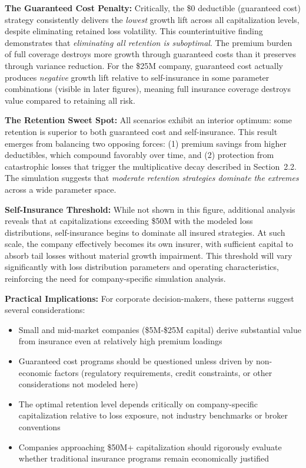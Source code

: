 \documentclass[11pt,letterpaper]{article}
\begin{document}
\vspace{\baselineskip}

\textbf{The Guaranteed Cost Penalty:} Critically, the \$0 deductible (guaranteed cost) strategy consistently delivers the \emph{lowest} growth lift across all capitalization levels, despite eliminating retained loss volatility. This counterintuitive finding demonstrates that \emph{eliminating all retention is suboptimal}. The premium burden of full coverage destroys more growth through guaranteed costs than it preserves through variance reduction. For the \$25M company, guaranteed cost actually produces \emph{negative} growth lift relative to self-insurance in some parameter combinations (visible in later figures), meaning full insurance coverage destroys value compared to retaining all risk.

\vspace{\baselineskip}

\textbf{The Retention Sweet Spot:} All scenarios exhibit an interior optimum: some retention is superior to both guaranteed cost and self-insurance. This result emerges from balancing two opposing forces: (1) premium savings from higher deductibles, which compound favorably over time, and (2) protection from catastrophic losses that trigger the multiplicative decay described in Section~2.2. The simulation suggests that \emph{moderate retention strategies dominate the extremes} across a wide parameter space.

\vspace{\baselineskip}

\textbf{Self-Insurance Threshold:} While not shown in this figure, additional analysis reveals that at capitalizations exceeding \$50M with the modeled loss distributions, self-insurance begins to dominate all insured strategies. At such scale, the company effectively becomes its own insurer, with sufficient capital to absorb tail losses without material growth impairment. This threshold will vary significantly with loss distribution parameters and operating characteristics, reinforcing the need for company-specific simulation analysis.

\vspace{\baselineskip}

\textbf{Practical Implications:} For corporate decision-makers, these patterns suggest several considerations:
\begin{itemize}
    \item Small and mid-market companies (\$5M-\$25M capital) derive substantial value from insurance even at relatively high premium loadings
    \item Guaranteed cost programs should be questioned unless driven by non-economic factors (regulatory requirements, credit constraints, or other considerations not modeled here)
    \item The optimal retention level depends critically on company-specific capitalization relative to loss exposure, not industry benchmarks or broker conventions
    \item Companies approaching \$50M+ capitalization should rigorously evaluate whether traditional insurance programs remain economically justified
\end{itemize}
\end{document}
